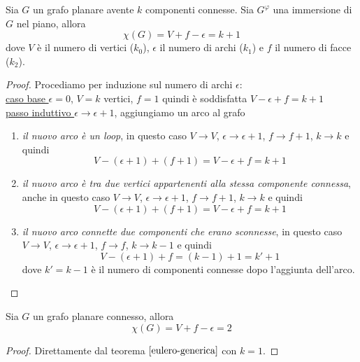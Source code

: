 \begin{teorema}\label{eulero-generica}
    Sia \(G\) un grafo planare avente \(k\) componenti connesse. Sia \(G^\varphi\) una immersione di \(G\) nel piano, allora
    \begin{equation}
        \chi(G)=V+f-\epsilon = k+1
    \end{equation}
    dove \(V\) è il numero di vertici (\(k_0\)), \(\epsilon\) il numero di archi (\(k_1\)) e \(f\) il numero di facce (\(k_2\)).
    \begin{proof}
        Procediamo per induzione sul numero di archi \( \epsilon \): \smallskip \\
        \underline{caso base \(\epsilon=0\)}, \(V=k\) vertici, \(f=1\) quindi è soddisfatta \(V-\epsilon+f = k+1\)\smallskip \\
        \underline{passo induttivo \(\epsilon \to \epsilon + 1\)}, aggiungiamo un arco al grafo
        \begin{enumerate}
            \item \textit{il nuovo arco è un loop}, in questo caso \(V \to V\), \(\epsilon \to \epsilon +1\), \(f \to f+1\), \(k \to k\) e quindi
                  \begin{equation}
                      V-(\epsilon+1)+(f+1)=V-\epsilon+f=k+1
                  \end{equation}
            \item \textit{il nuovo arco è tra due vertici appartenenti alla stessa componente connessa}, anche in questo caso \(V \to V\), \(\epsilon \to \epsilon +1\), \(f \to f+1\), \(k \to k\) e quindi
                  \begin{equation}
                      V-(\epsilon+1)+(f+1)=V-\epsilon+f=k+1
                  \end{equation}
            \item \textit{il nuovo arco connette due componenti che erano sconnesse}, in questo caso \(V \to V\), \(\epsilon \to \epsilon +1\), \(f \to f\), \(k \to k-1\) e quindi
                  \begin{equation}
                      V-(\epsilon +1)+f = (k-1) + 1 = k'+1
                  \end{equation}
                  dove \(k'=k-1\) è il numero di componenti connesse dopo l'aggiunta dell'arco.
        \end{enumerate}
    \end{proof}
\end{teorema}

\begin{corollario}\label{formulaeulero}
    Sia \(G\) un grafo planare connesso, allora
    \begin{equation}
        \chi(G)=V+f-\epsilon = 2
    \end{equation}
    \begin{proof}
        Direttamente dal teorema \(\ref{eulero-generica}\) con \(k=1\).
    \end{proof}
\end{corollario}

